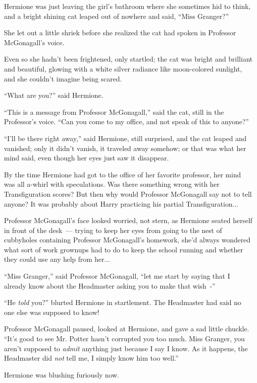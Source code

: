Hermione was just leaving the girl's bathroom where she sometimes hid to think, and a bright shining cat leaped out of nowhere and said, ``Miss Granger?''

She let out a little shriek before she realized the cat had spoken in Professor McGonagall's voice.

Even so she hadn't been frightened, only startled; the cat was bright and brilliant and beautiful, glowing with a white silver radiance like moon-colored sunlight, and she couldn't imagine being scared.

``What are you?'' said Hermione.

``This is a message from Professor McGonagall,'' said the cat, still in the Professor's voice. ``Can you come to my office, and not speak of this to anyone?''

``I'll be there right away,'' said Hermione, still surprised, and the cat leaped and vanished; only it didn't vanish, it traveled away somehow; or that was what her mind said, even though her eyes just saw it disappear.

By the time Hermione had got to the office of her favorite professor, her mind was all a-whirl with speculations. Was there something wrong with her Transfiguration scores? But then why would Professor McGonagall say not to tell anyone? It was probably about Harry practicing his partial Transfiguration...

Professor McGonagall's face looked worried, not stern, as Hermione seated herself in front of the desk~--- trying to keep her eyes from going to the nest of cubbyholes containing Professor McGonagall's homework, she'd always wondered what sort of work grownups had to do to keep the school running and whether they could use any help from her...

``Miss Granger,'' said Professor McGonagall, ``let me start by saying that I already know about the Headmaster asking you to make that wish~-''

``He \emph{told} you?'' blurted Hermione in startlement. The Headmaster had said no one else was supposed to know!

Professor McGonagall paused, looked at Hermione, and gave a sad little chuckle. ``It's good to see Mr. Potter hasn't corrupted you too much. Miss Granger, you aren't supposed to \emph{admit} anything just because I say I know. As it happens, the Headmaster did \emph{not} tell me, I simply know him too well.''

Hermione was blushing furiously now.

